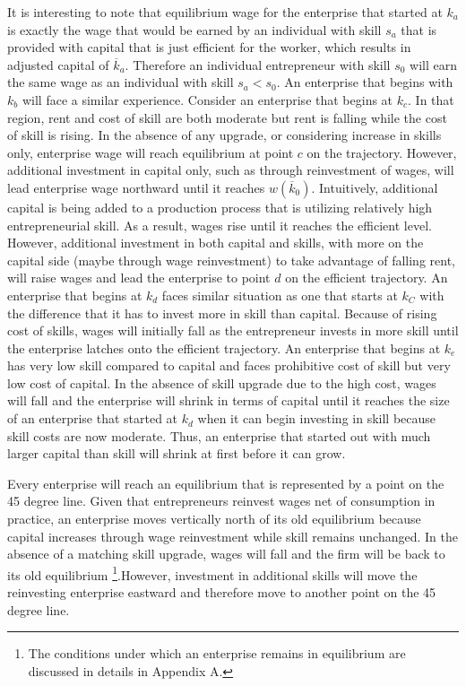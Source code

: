 \documentclass[
  a4paper,
  DIV=11,
  numbers=noendperiod]{scrartcl}
\begin{document}
It is interesting to note that equilibrium wage for the enterprise that
started at \(k_a\) is exactly the wage that would be earned by an
individual with skill \(s_a\) that is provided with capital that is just
efficient for the worker, which results in adjusted capital of
\(\overline{k}_a\). Therefore an individual entrepreneur with skill
\(s_0\) will earn the same wage as an individual with skill \(s_a<s_0\).
An enterprise that begins with \(k_b\) will face a similar experience.
Consider an enterprise that begins at \(k_c.\) In that region, rent and
cost of skill are both moderate but rent is falling while the cost of
skill is rising. In the absence of any upgrade, or considering increase
in skills only, enterprise wage will reach equilibrium at point \(c\) on
the trajectory. However, additional investment in capital only, such as
through reinvestment of wages, will lead enterprise wage northward until
it reaches \(w(\overline{k}_0)\). Intuitively, additional capital is
being added to a production process that is utilizing relatively high
entrepreneurial skill. As a result, wages rise until it reaches the
efficient level. However, additional investment in both capital and
skills, with more on the capital side (maybe through wage reinvestment)
to take advantage of falling rent, will raise wages and lead the
enterprise to point \(d\) on the efficient trajectory. An enterprise
that begins at \(k_d\) faces similar situation as one that starts at
\(k_C\) with the difference that it has to invest more in skill than
capital. Because of rising cost of skills, wages will initially fall as
the entrepreneur invests in more skill until the enterprise latches onto
the efficient trajectory. An enterprise that begins at \(k_e\) has very
low skill compared to capital and faces prohibitive cost of skill but
very low cost of capital. In the absence of skill upgrade due to the
high cost, wages will fall and the enterprise will shrink in terms of
capital until it reaches the size of an enterprise that started at
\(k_d\) when it can begin investing in skill because skill costs are now
moderate. Thus, an enterprise that started out with much larger capital
than skill will shrink at first before it can grow.

Every enterprise will reach an equilibrium that is represented by a
point on the 45 degree line. Given that entrepreneurs reinvest wages net
of consumption in practice, an enterprise moves vertically north of its
old equilibrium because capital increases through wage reinvestment
while skill remains unchanged. In the absence of a matching skill
upgrade, wages will fall and the firm will be back to its old
equilibrium \footnote{The conditions under which an enterprise remains
  in equilibrium are discussed in details in Appendix A.}.However,
investment in additional skills will move the reinvesting enterprise
eastward and therefore move to another point on the 45 degree line.
\end{document}
